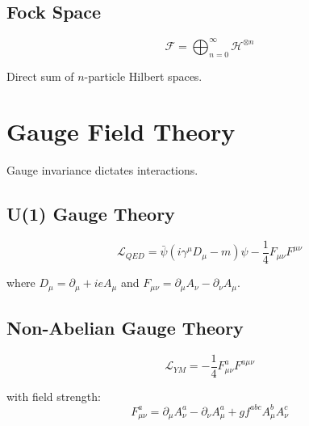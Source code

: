 \subsection{Fock Space}

\begin{definition}
\label{fa_21:def:fock}
\begin{equation}
\mathcal{F} = \bigoplus_{n=0}^\infty \mathcal{H}^{\otimes n}
\end{equation}

Direct sum of $n$-particle Hilbert spaces.
\end{definition}

\section{Gauge Field Theory}

Gauge invariance dictates interactions.

\subsection{U(1) Gauge Theory}

\begin{definition}
\label{fa_21:def:qed}
\begin{equation}
\mathcal{L}_{QED} = \bar{\psi}(i\gamma^\mu D_\mu - m)\psi - \frac{1}{4}F_{\mu\nu}F^{\mu\nu}
\end{equation}

where $D_\mu = \partial_\mu + ieA_\mu$ and $F_{\mu\nu} = \partial_\mu A_\nu - \partial_\nu A_\mu$.
\end{definition}

\subsection{Non-Abelian Gauge Theory}

\begin{definition}
\label{fa_21:def:yang-mills}
\begin{equation}
\mathcal{L}_{YM} = -\frac{1}{4}F_{\mu\nu}^a F^{a\mu\nu}
\end{equation}

with field strength:
\begin{equation}
F_{\mu\nu}^a = \partial_\mu A_\nu^a - \partial_\nu A_\mu^a + gf^{abc}A_\mu^b A_\nu^c
\end{equation}
\end{definition}

